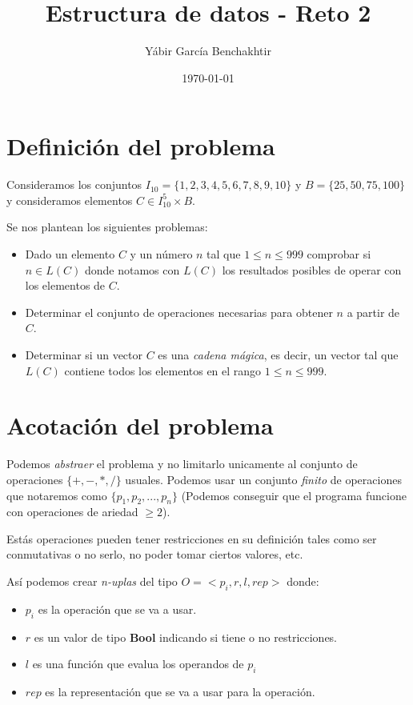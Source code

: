 \documentclass{article}
\begin{document}
\title{Estructura de datos - Reto 2}
\author{Yábir García Benchakhtir}
\date{\today}
\maketitle

\section{Definición del problema}

Consideramos los conjuntos $I_{10} = \{1,2,3,4,5,6,7,8,9,10\}$ y
$B = \{25,50,75,100\}$ y consideramos elementos
$C \in I_{10}^{5} \times B$.

Se nos plantean los siguientes problemas:

\begin{itemize}
\item Dado un elemento $C$ y un número $n$ tal que $1 \le n \le 999$
  comprobar si $n \in L(C)$ donde notamos con $L(C)$ los resultados
  posibles de operar con los elementos de $C$.

\item Determinar el conjunto de operaciones necesarias para obtener
  $n$ a partir de $C$.

\item Determinar si un vector $C$ es una \textit{cadena mágica}, es
  decir, un vector tal que $L(C)$ contiene todos los elementos en el
  rango $1 \le n \le 999$.
\end{itemize}

\section{Acotación del problema}

Podemos \textit{abstraer} el problema y no limitarlo unicamente al
conjunto de operaciones $\{+,-,*,/\}$ usuales. Podemos usar un
conjunto \textit{finito} de operaciones que notaremos como
$\{p_1, p_2, ..., p_n\}$ (Podemos conseguir que el programa funcione con operaciones
de ariedad $\ge 2 $).

Estás operaciones pueden tener restricciones en su definición tales
como ser conmutativas o no serlo, no poder tomar ciertos valores, etc.

Así podemos crear \textit{n-uplas} del tipo $O = <p_i, r, l, rep>$
donde:

\begin{itemize}
\item $p_i$ es la operación que se va a usar.
\item $r$ es un valor de tipo \textbf{Bool} indicando si tiene o no
  restricciones.
\item $l$ es una función que evalua los operandos de $p_i$
\item $rep$ es la representación que se va a usar para la operación. 
\end{itemize}
\end{document}
